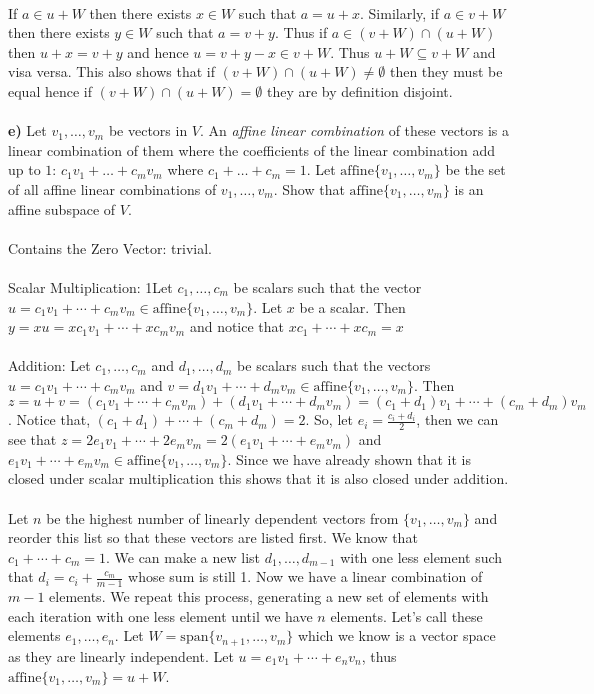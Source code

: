 \documentclass[11pt]{amsart}
\theoremstyle{definition}  %
\begin{document}
\\
If $a \in u+W$ then there exists $x\in W$ such that $a=u+x$. Similarly, if $a \in v+W$ then there exists $y \in W$ such that $a=v+y$.  Thus if $a \in (v+W) \cap (u+W)$ then $u+x=v+y$ and hence $u= v+y-x \in v +W$.  Thus $u+W \subseteq v+W$ and visa versa. This also shows that if $(v+W)\cap(u+W) \ne \emptyset$ then they must be equal hence if $(v+W)\cap(u+W) = \emptyset$ they are by definition disjoint.\\
\\
{\bf e)} Let $v_1, \ldots, v_m$ be vectors in $V$. An {\it affine linear combination} of these vectors is a linear combination of them where
the coefficients of the linear combination add up to $1$: $c_1 v_1 + \ldots + c_m v_m$ where $c_1 + \ldots + c_m =1$. Let 
$\mathrm{affine}\{v_1, \ldots, v_m\}$ be the set of all affine linear combinations of $v_1, \ldots, v_m$. 
Show that $\mathrm{affine}\{v_1, \ldots, v_m\}$ is an affine subspace of $V$.  \\
\\
Contains the Zero Vector: trivial.\\
\\
Scalar Multiplication: 1Let $c_1, \dots, c_m$ be scalars such that the vector $u=c_1v_1+\cdots +c_mv_m \in \mathrm{affine}\{v_1,\dots, v_m\}$.  Let $x$ be a scalar. Then $y=xu=xc_1v_1+\cdots +xc_mv_m$ and notice that $xc_1+\cdots+xc_m=x$\\
\\
Addition: Let $c_1, \dots, c_m$ and $d_1, \dots, d_m$ be scalars such that the vectors $u=c_1v_1+\cdots +c_mv_m$ and $v=d_1v_1+\cdots+d_mv_m \in \mathrm{affine}\{v_1,\dots, v_m\}$.  Then $z=u+v=(c_1v_1+\cdots +c_mv_m)+(d_1v_1+\cdots+d_mv_m) = (c_1+d_1)v_1+\cdots+(c_m+d_m)v_m$.  Notice that, $(c_1+d_1)+\cdots+(c_m+d_m) = 2$.  So, let $e_i=\frac{c_i+d_i}{2}$, then we can see that $z=2e_1v_1+\cdots+2e_mv_m=2(e_1v_1+\cdots+e_mv_m)$ and $e_1v_1+\cdots+e_mv_m \in \mathrm{affine}\{v_1,\dots,v_m\}$.  Since we have already shown that it is closed under scalar multiplication this shows that it is also closed under addition.\\
\\
Let $n$ be the highest number of linearly dependent vectors from $\{v_1, \dots, v_m\}$ and reorder this list so that these vectors are listed first.  We know that $c_1+\cdots+c_m=1$.  We can make a new list $d_1,\dots,d_{m-1}$ with one less element such that $d_i=c_i+\frac{c_m}{m-1}$ whose sum is still 1.  Now we have a linear combination of $m-1$ elements.  We repeat this process, generating a new set of elements with each iteration with one less element until we have $n$ elements. Let's call these elements $e_1,\dots,e_n$.  Let $W=\mathrm{span}\{v_{n+1}, \dots, v_m\}$ which we know is a vector space as they are linearly independent.  Let $u=e_1v_1+\cdots+e_nv_n$, thus $\mathrm{affine}\{v_1,\dots,v_m\} = u+W$.
\end{document}
